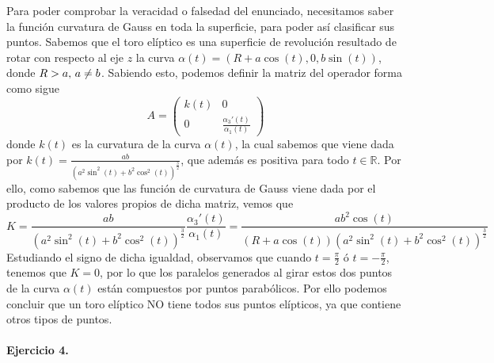 \documentclass[fleqn]{article}
\def\R{\mathds{R}}
\begin{document}
    Para poder comprobar la veracidad o falsedad del enunciado, necesitamos saber la función curvatura de Gauss en toda la superficie, para poder así clasificar sus puntos. Sabemos que el 
    toro elíptico es una superficie de revolución resultado de rotar con respecto al eje $z$ la curva $\alpha(t) = (R + a\cos(t), 0, b\sin(t))$, donde $R>a, \thinspace a \neq b$. Sabiendo esto,
    podemos definir la matriz del operador forma como sigue 
    $$A=
    \begin{pmatrix}
        k(t) & 0 \\
        0 & \frac{\alpha_3'(t)}{\alpha_1(t)}
    \end{pmatrix}
    $$
    donde $k(t)$ es la curvatura de la curva $\alpha(t)$, la cual sabemos que viene dada por $k(t)=\frac{ab}{(a^2\sin^2(t) + b^2 \cos^2(t))^{\frac{3}{2}}}$, que además es positiva
    para todo $t\in \R$. Por ello, como sabemos que las función de curvatura de Gauss viene dada por el producto de los valores propios de dicha matriz, vemos que
    $$K = \frac{ab}{(a^2\sin^2(t) + b^2 \cos^2(t))^{\frac{3}{2}}} \frac{\alpha_3'(t)}{\alpha_1(t)} = \frac{ab^2 \cos(t)}{(R + a\cos(t))(a^2\sin^2(t) + b^2 \cos^2(t))^{\frac{3}{2}}}$$
    Estudiando el signo de dicha igualdad, observamos que cuando $t=\frac{\pi}{2}$ ó $t=-\frac{\pi}{2}$, tenemos que $K=0$, por lo que los paralelos generados al girar estos dos puntos
    de la curva $\alpha(t)$ están compuestos por puntos parabólicos. Por ello podemos concluir que un toro elíptico NO tiene todos sus puntos elípticos, ya que contiene otros 
    tipos de puntos. \\ \\

    \textbf{Ejercicio 4. } \\
   
\end{document}
